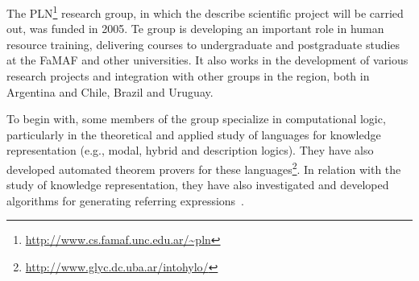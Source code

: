 

The PLN\footnote{\url{http://www.cs.famaf.unc.edu.ar/~pln}} research group, 
in which the describe scientific project will be carried out, was funded in 2005.
Te group is developing an important role in human resource training,
delivering courses to undergraduate and postgraduate studies at the FaMAF and
other universities. It also works in the development of various research
projects and integration with other groups in the region, both in Argentina and
Chile, Brazil and Uruguay. 

 

To begin with, some members of the group specialize in computational
logic, particularly in the theoretical and applied study of languages for
knowledge representation (e.g., modal, hybrid and description logics). They
have also developed  automated theorem provers for these
languages\footnote{\url{http://www.glyc.dc.uba.ar/intohylo/}}. In relation with 
the study of knowledge representation, they have also investigated and developed
algorithms for generating referring expressions~\cite{AKS08}.

